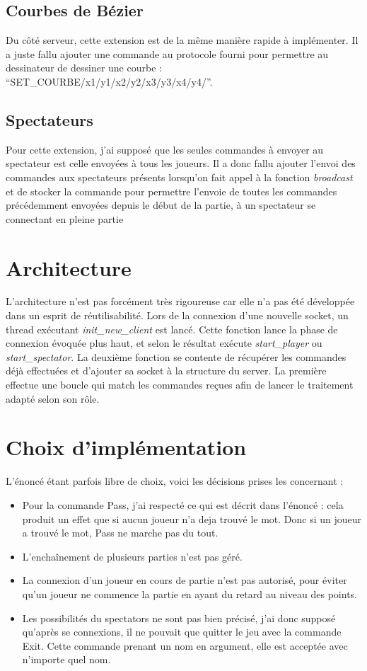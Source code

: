\documentclass[a4paper, 11pt]{report}
\begin{document}
\subsection{Courbes de Bézier}

Du côté serveur, cette extension est de la même manière rapide à
implémenter.
Il a juste fallu ajouter une commande au protocole fourni pour
permettre au dessinateur de dessiner une courbe : ``SET\_COURBE/x1/y1/x2/y2/x3/y3/x4/y4/''. 

\subsection{Spectateurs}

Pour cette extension, j'ai supposé que les seules commandes à envoyer
au spectateur est celle envoyées à tous les joueurs. Il a donc fallu
ajouter l'envoi des commandes aux spectateurs présents lorsqu'on fait
appel à la fonction \emph{broadcast} et de stocker la commande pour
permettre l'envoie de toutes les commandes précédemment envoyées
depuis le début de la partie, à un spectateur se connectant en pleine
partie



\section{Architecture}

L'architecture n'est pas forcément très rigoureuse car elle n'a pas
été développée dans un esprit de réutilisabilité. Lors de la connexion
d'une nouvelle socket, un thread exécutant \emph{init\_new\_client}
est lancé. Cette fonction lance la phase de connexion évoquée plus
haut, et selon le résultat exécute \emph{start\_player} ou
\emph{start\_spectator}. La deuxième fonction se contente de récupérer 
les commandes déjà effectuées et d'ajouter sa socket à la structure du
server. La première effectue une boucle qui match les commandes reçues
afin de lancer le traitement adapté selon son rôle.

\section{Choix d'implémentation}
L'énoncé étant parfois libre de choix, voici les décisions prises les
concernant :
 \begin{itemize}
\item Pour la commande Pass, j'ai respecté ce qui est décrit dans
  l'énoncé : cela produit un effet que si aucun joueur n'a deja trouvé
  le mot. Donc si un joueur a trouvé le mot, Pass ne marche pas du tout.
\item L'enchaînement de plusieurs parties n'est pas géré.
\item La connexion d'un joueur en cours de partie n'est pas autorisé,
  pour éviter qu'un joueur ne commence la partie en ayant du retard au
  niveau des points. 
\item Les possibilités du spectators ne sont pas bien précisé, j'ai
  donc supposé qu'après se connexions, il ne pouvait que quitter le
  jeu avec la commande Exit. Cette commande prenant un nom en
  argument, elle est acceptée avec n'importe quel nom.
\end{itemize}
\end{document}
